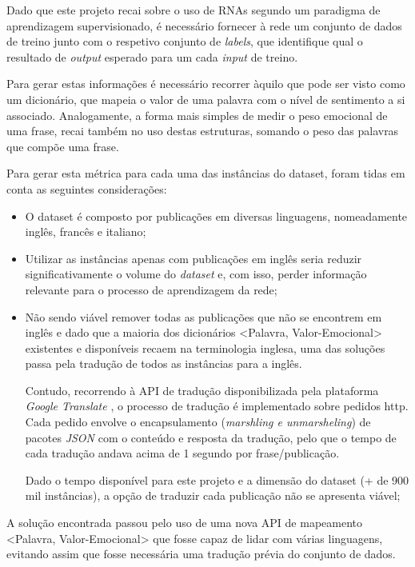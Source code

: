 Dado que este projeto recai sobre o uso de RNAs segundo um paradigma de aprendizagem supervisionado, é necessário fornecer à rede um conjunto de dados de treino junto com o respetivo conjunto de \textit{labels}, que identifique qual o resultado de \textit{output} esperado para um cada \textit{input} de treino.

Para gerar estas informações é necessário recorrer àquilo que pode ser visto como um dicionário, que mapeia o valor de uma palavra com o nível de sentimento a si associado. 
Analogamente, a forma mais simples de medir o peso emocional de uma frase, recai também no uso destas estruturas, somando o peso das palavras que compõe uma frase.  

Para gerar esta métrica para cada uma das instâncias do dataset, foram tidas em conta as seguintes considerações: 

\begin{itemize}
    \item O dataset é composto por publicações em diversas linguagens, nomeadamente inglês, francês e italiano;
    
    \item Utilizar as instâncias apenas com publicações em inglês seria reduzir significativamente o volume do \textit{dataset} e, com isso, perder informação relevante para o processo de aprendizagem da rede; 
    
    \item Não sendo viável remover todas as publicações que não se encontrem em inglês e dado que a maioria dos dicionários <Palavra, Valor-Emocional> existentes e disponíveis recaem na terminologia inglesa, uma das soluções passa pela tradução de todos as instâncias para a inglês. 
    
    Contudo, recorrendo à API de tradução disponibilizada pela plataforma \textit{Google Translate} \cite{googleTransAPI}, o processo de tradução é implementado sobre pedidos http. 
    Cada pedido envolve o encapsulamento (\textit{marshling e unmarsheling}) de pacotes \textit{JSON} com o conteúdo e resposta da tradução, pelo que o tempo de cada tradução andava acima de 1 segundo por frase/publicação. 
    
    Dado o tempo disponível para este projeto e a dimensão do dataset (+ de 900 mil instâncias), a opção de traduzir cada publicação não se apresenta viável;
\end{itemize}

A solução encontrada passou pelo uso de uma nova API de mapeamento <Palavra, Valor-Emocional> que fosse capaz de lidar com várias linguagens, evitando assim que fosse necessária uma tradução prévia do conjunto de dados. 

